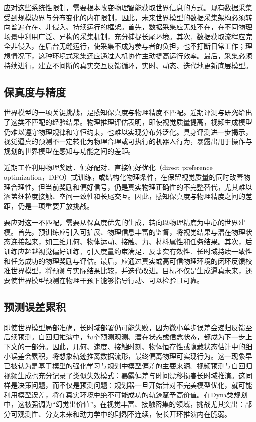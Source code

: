应对这些系统性限制，需要根本改变物理智能获取世界信息的方式。现有数据采集受到规模边界与分布变化的内在限制，因此，未来世界模型的数据采集架构必须转向普遍存在、非侵入、持续运行的框架。首先，数据采集应无处不在，在不同物理场景中利用广泛、异构的采集机制，充分捕捉长尾环境。其次，数据获取流程应完全非侵入，在后台无缝运行，使采集不成为参与者的负担，也不打断日常工作；理想情况下，这种环境式采集还应通过人机协作主动提高运行效率。最后，采集必须持续进行，建立不间断的真实交互反馈循环，实时、动态、迭代地更新底层模型。

\subsection{保真度与精度}
世界模型的一项关键挑战，是感知保真度与物理精度不匹配。近期评测与研究给出了这类不匹配的经验结果。物理推理评估\citep{kang2024far,motamed2025generative,zhang2025morpheus,meng2024towards,gu2025phyworldbench,zheng2025vbench}表明，即使视觉质量提高，视频生成模型仍难以遵守物理规律和守恒约束，也难以实现分布外泛化。具身评测\citep{jiang2026robowm,shang2026worldarena}进一步揭示，视觉逼真的预测不一定转化为物理合理或可执行的机器人行为，暴露出用于操作与规划的世界模型在感知与功能之间的差距。

近期工作\citep{zhao2026phyworld,chen2026abot,wang2025physcorr,lin2026mmphysvideo}利用物理奖励、偏好配对、直接偏好优化（direct preference optimization，DPO）式训练，或结构化物理条件，在保留视觉质量的同时改善物理合理性。但当前奖励和偏好信号，仍是真实物理正确性的不完整替代，尤其难以涵盖细粒度接触、空间一致性和长尾交互。因此，感知保真度与物理精度之间的差距，仍是一项重要开放挑战。

要应对这一不匹配，需要从保真度优先的生成，转向以物理精度为中心的世界建模。首先，预训练应引入可扩展、物理信息丰富的监督，将视觉结果与潜在物理状态连接起来，如三维几何、物体运动、接触、力、材料属性和任务结果。其次，后训练应超越视觉偏好训练，引入度量约束满足、反事实有效性、长时域持续一致性和任务成功的物理奖励与评估。最后，应通过真实或高可信物理环境的闭环反馈校准世界模型，将预测与实际结果比较，并迭代改进。目标不仅是生成逼真未来，还要使世界模型预测在物理干预下能够指导行动、可以检验且可靠。

\subsection{预测误差累积}
即使世界模型局部准确，长时域部署仍可能失败，因为微小单步误差会递归反馈至后续预测。自回归推演中，每个预测观测、潜在状态或信念状态，都成为下一步上下文的一部分。因此，几何、速度、接触时刻、物体恒存性或隐藏状态估计中的细小误差会累积，将想象轨迹推离数据流形，最终偏离物理可实现行为。这一现象早已被认为是基于模型的强化学习与规划中模型偏差的主要来源\citep{talvitie2017selfcorrecting,lambert2022compounding}。视频预测与自回归视频生成也充分记录了类似失效模式：暴露偏差与时间漂移损害长时域推演\citep{nair2019hvf,chen2024diffusionforcing,huang2025selfforcing}。这同样是决策问题，而不仅是预测问题：规划器一旦开始针对不完美模型优化，就可能利用模型误差，将在真实环境中绝不可能成功的轨迹赋予高价值。在Dyna类规划中，这被强调为“幻觉出价值”\citep{jafferjee2020hallucinating}。在视觉丰富、接触密集的领域，挑战尤其突出：部分可观测性、分支未来和动力学中的剧烈不连续，使长开环推演内在脆弱。

